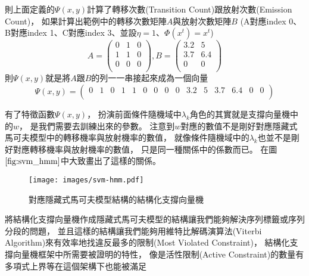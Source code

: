     則上面定義的$\Psi(x, y)$計算了轉移次數(Transition Count)跟放射次數(Emission Count)，
    如果計算出範例中的轉移次數矩陣$A$與放射次數矩陣$B$
    (A對應index 0、B對應index 1、C對應index 3、並設$\eta = 1$、$\Phi(x^t) = x^t$)
    \begin{equation}
        A = 
        \left(
        \begin{array}{ccc}
            0 & 1 & 0 \\
            1 & 1 & 0 \\
            0 & 0 & 0 \\
        \end{array}
        \right)
        ,
        B = 
        \left(
        \begin{array}{cc}
            3.2 & 5 \\
            3.7 & 6.4 \\
            0 & 0 \\
        \end{array}
        \right)
    \end{equation}
    則$\Psi(x,y)$就是將$A$跟$B$的列一一串接起來成為一個向量
    \begin{equation}
      \Psi(x,y) = 
      \left(
	    \begin{array}{ccccccccccccccc}
        0 & 1 & 0 & 1 & 1 & 0 & 0 & 0 & 0 & 3.2 & 5 & 3.7 & 6.4 & 0 & 0 \\
	    \end{array}
      \right)
    \end{equation}
    
    有了特徵函數$\Psi(x,y)$，
    扮演前面條件隨機域中$\lambda_k$角色的其實就是支撐向量機中的$w$，
    是我們需要去訓練出來的參數。
    注意到$w$對應的數值不是剛好對應隱藏式馬可夫模型中的轉移機率與放射機率的數值，
    就像條件隨機域中的$\lambda_k$也並不是剛好對應轉移機率與放射機率的數值，
    只是同一種關係中的係數而已。
    在圖$\ref{fig:svm_hmm}$中大致畫出了這樣的關係。

    \begin{figure}
      \begin{center}
	\texttt{[image: images/svm-hmm.pdf]}
      \end{center}
      \caption{對應隱藏式馬可夫模型結構的結構化支撐向量機}
      \label{fig:svm_hmm}
    \end{figure}

    將結構化支撐向量機作成隱藏式馬可夫模型的結構讓我們能夠解決序列標籤或序列分段的問題，
    並且這樣的結構讓我們能夠用維特比解碼演算法(Viterbi Algorithm)來有效率地找違反最多的限制(Most Violated Constraint)，
    結構化支撐向量機框架中所需要被證明的特性，
    像是活性限制(Active Constraint)的數量有多項式上界等在這個架構下也能被滿足


